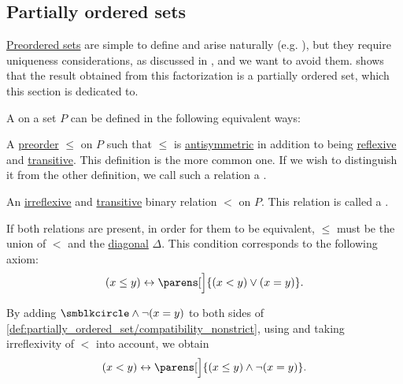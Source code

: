 \subsection{Partially ordered sets}\label{subsec:partially_ordered_sets}

\hyperref[def:preordered_set]{Preordered sets} are simple to define and arise naturally (e.g. ), but they require uniqueness considerations, as discussed in , and we want to avoid them.  shows that the result obtained from this factorization is a partially ordered set, which this section is dedicated to.

\begin{definition}\label{def:partially_ordered_set}
  A  on a set \( P \) can be defined in the following equivalent ways:
  \begin{thmenum}[series=def:partially_ordered_set]
     A \hyperref[def:preordered_set]{preorder} \( \leq \) on \( P \) such that \( \leq \) is \hyperref[def:binary_relation/antisymmetric]{antisymmetric} in addition to being \hyperref[def:binary_relation/reflexive]{reflexive} and \hyperref[def:binary_relation/transitive]{transitive}. This definition is the more common one. If we wish to distinguish it from the other definition, we call such a relation a .

     An \hyperref[def:binary_relation/irreflexive]{irreflexive} and \hyperref[def:binary_relation/transitive]{transitive} binary relation \( < \) on \( P \). This relation is called a .
  \end{thmenum}

  If both relations are present, in order for them to be equivalent, \( \leq \) must be the union of \( < \) and the \hyperref[def:binary_relation/diagonal]{diagonal} \( \Delta \). This condition corresponds to the following axiom:
  \begin{equation}\label{def:partially_ordered_set/compatibility_nonstrict}
    (x \leq y) \leftrightarrow \parens[\Big]{(x < y) \vee (x = y)}.
  \end{equation}

  By adding \( \anon \wedge \neg (x = y) \) to both sides of \eqref{def:partially_ordered_set/compatibility_nonstrict}, using  and taking irreflexivity of \( < \) into account, we obtain
  \begin{equation}\label{def:partially_ordered_set/compatibility_strict}
    (x < y) \leftrightarrow \parens[\Big]{(x \leq y) \wedge \neg (x = y)}.
  \end{equation}


\end{definition}
